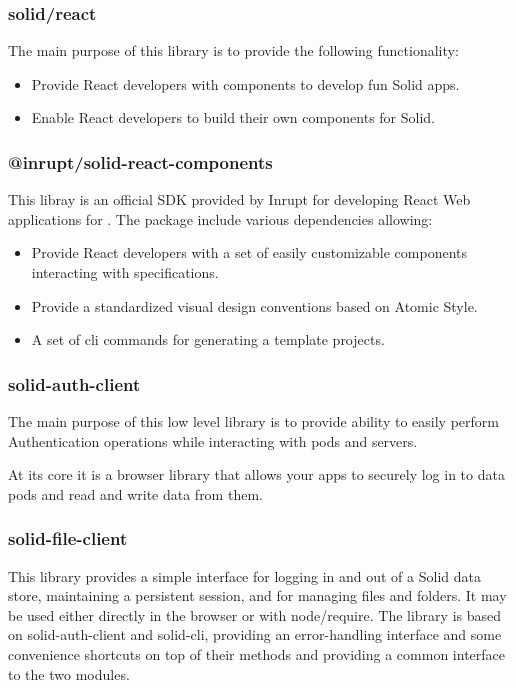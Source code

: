 \subsubsection{solid/react}

The main purpose of this library is to provide the following functionality:

\begin{itemize}
	\item Provide React developers with components to develop fun Solid apps.
    \item Enable React developers to build their own components for Solid.
\end{itemize}

\subsubsection{@inrupt/solid-react-components}

This libray is an official SDK provided by Inrupt for developing React Web applications for \solid{}. The package include various dependencies allowing:

\begin{itemize}
	\item Provide React developers with a set of easily customizable components interacting with \solid{} specifications.
    \item Provide a standardized visual design conventions based on Atomic Style.
    \item A set of cli commands for generating a template \solid{} projects.
\end{itemize}

\subsubsection{solid-auth-client}

The main purpose of this low level library is to provide ability to easily perform Authentication operations while interacting with \solid{} pods and servers.

At its core it is a browser library that allows your apps to securely log in to \solid{} data pods and read and write data from them.

\subsubsection{solid-file-client}

This library provides a simple interface for logging in and out of a Solid data store, maintaining a persistent session, and for managing files and folders. It may be used either directly in the browser or with node/require. The library is based on solid-auth-client and solid-cli, providing an error-handling interface and some convenience shortcuts on top of their methods and providing a common interface to the two modules.

